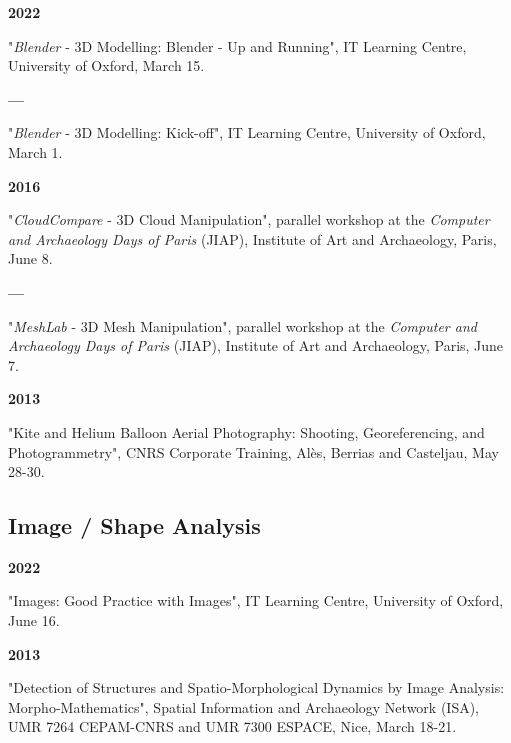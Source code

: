 \documentclass{article}
\newcommand{\fr}[1]{}       %
\newcommand{\en}[1]{#1}     %
\begin{document}
\textbf{2022 }
\fr{"\textit{Blender} - 3d Modelling: Blender - Up and running", IT Learning Centre, University of Oxford, 15 Mars.}
\en{"\textit{Blender} - 3D Modelling: Blender - Up and Running", IT Learning Centre, University of Oxford, March 15.}

\smallbreak
\textbf{--- }
\fr{"\textit{Blender} - 3d modelling: Kick-off", IT Learning Centre, University of Oxford, 1 Mars.}
\en{"\textit{Blender} - 3D Modelling: Kick-off", IT Learning Centre, University of Oxford, March 1.}

\smallbreak
\textbf{2016 }
\fr{"\textit{CloudCompare} - manipulation de nuages 3D", atelier en parallèle des \textit{Journées informatique et archéologies de Paris} (JIAP), Institut d'Art et d'Archéologie, Paris, 8 Juin.}
\en{"\textit{CloudCompare} - 3D Cloud Manipulation", parallel workshop at the \textit{Computer and Archaeology Days of Paris} (JIAP), Institute of Art and Archaeology, Paris, June 8.}

\smallbreak
\textbf{--- }
\fr{"\textit{MeshLab} - manipulation de maillages 3D", atelier en parallèle des \textit{Journées informatique et archéologies de Paris} (JIAP), Institut d'Art et d'Archéologie, Paris, 7 Juin.}
\en{"\textit{MeshLab} - 3D Mesh Manipulation", parallel workshop at the \textit{Computer and Archaeology Days of Paris} (JIAP), Institute of Art and Archaeology, Paris, June 7.}

\smallbreak
\textbf{2013 }
\fr{"Photographie aérienne par cerf-volant et ballon à hélium : prise de vue, géoréférencement et photogrammétrie", CNRS formation entreprises, Alès, Berrias et Casteljau, 28-30 Mai.}
\en{"Kite and Helium Balloon Aerial Photography: Shooting, Georeferencing, and Photogrammetry", CNRS Corporate Training, Alès, Berrias and Casteljau, May 28-30.}

\smallbreak

\subsection*{\fr{Image / Analyse de forme}\en{Image / Shape Analysis}}

\textbf{2022 }
\fr{"Images: Good Practice with Images", IT Learning Centre, University of Oxford, 16 Juin.}
\en{"Images: Good Practice with Images", IT Learning Centre, University of Oxford, June 16.}

\smallbreak
\textbf{2013 }
\fr{"Detection of structures and spatio-morphological dynamics by image analyses: morpho-mathematics", réseau \textit{Information Spatiale et Archéologie} (ISA), UMR 7264 CEPAM-CNRS and UMR 7300 ESPACE, Nice, 18-21 Mars.}
\en{"Detection of Structures and Spatio-Morphological Dynamics by Image Analysis: Morpho-Mathematics", Spatial Information and Archaeology Network (ISA), UMR 7264 CEPAM-CNRS and UMR 7300 ESPACE, Nice, March 18-21.}
\end{document}
